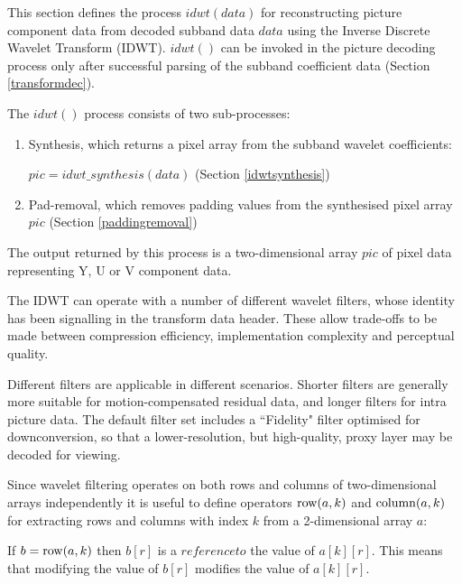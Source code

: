 
\label{idwt}

This section defines the process $idwt(data)$ for reconstructing picture component data
from decoded subband data $data$ using the Inverse Discrete Wavelet Transform (IDWT). $idwt()$
can be invoked in the picture decoding process only after successful parsing of the
subband coefficient data (Section \ref{transformdec}).

The $idwt()$ process consists of two sub-processes:

\begin{enumerate}
\item Synthesis, which returns a pixel array from the subband wavelet
coefficients: 

$pic=idwt\_synthesis(data)$ (Section \ref{idwtsynthesis})
\item Pad-removal, which removes padding values from the synthesised pixel array $pic$ (Section \ref{paddingremoval})
\end{enumerate}

The output returned by this process is a two-dimensional array $pic$ of pixel data representing
Y, U or V component data.

\begin{informative}
The IDWT can operate with a number of different wavelet filters, whose identity has
been signalling in the transform data header. These allow trade-offs to be made
between compression efficiency, implementation complexity and perceptual quality.

Different filters are applicable in different scenarios. Shorter filters are generally more
suitable for motion-compensated residual data, and longer filters for intra picture data.
The default filter set includes a ``Fidelity" filter optimised for downconversion, so that a lower-resolution,
but high-quality, proxy layer may be decoded for viewing.
\end{informative}

Since wavelet filtering operates on both rows and columns of two-dimensional arrays independently
it is useful to define operators $\operatorname{row}(a,k)$ and $\operatorname{column}(a,k)$ for extracting rows and columns
with index $k$ from a 2-dimensional array $a$:

If $b=\operatorname{row}(a,k)$ then $b[r]$ is a $reference to$ the value of $a[k][r]$. This means that modifying the
value of $b[r]$ modifies the value of $a[k][r]$.

